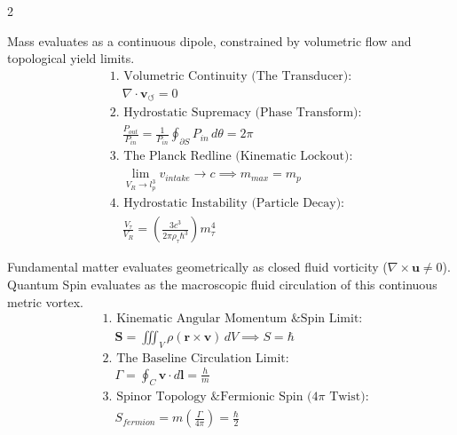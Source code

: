 \documentclass[11pt, a4paper]{article}
\newcounter{cheatnum}
\begin{document}
\begin{multicols}{2}
\begin{tcolorbox}[cheatbox, title={\refstepcounter{cheatnum}\label{box:bag_pressure}\thecheatnum. Confinement Pressure \& Work \scriptsize\hfill\hyperref[sec:deriv_bag_pressure]{[Proof $\downarrow$]}}]
\end{tcolorbox}



\begin{tcolorbox}[cheatbox, title={\refstepcounter{cheatnum}\label{box:unified_engine}\thecheatnum. The Unified Topological Engine \scriptsize\hfill\hyperref[sec:deriv_unified_engine]{[Proof $\downarrow$]}}]
Mass evaluates as a continuous dipole, constrained by volumetric flow and topological yield limits.
\begin{align}
&\text{1. Volumetric Continuity (The Transducer):} \nonumber \\
    &\quad \nabla \cdot \mathbf{v}_{\circlearrowleft} = 0 \label{eq:engine_transduction} \\
    &\text{2. Hydrostatic Supremacy (Phase Transform):} \nonumber \\
    &\quad \frac{P_{out}}{P_{in}} = \frac{1}{P_{in}} \oint_{\partial S} P_{in} \, d\theta = 2\pi \label{eq:engine_supremacy} \\
    &\text{3. The Planck Redline (Kinematic Lockout):} \nonumber \\
    &\quad \lim_{V_R \to l_p^3} v_{intake} \to c \implies m_{max} = m_p \label{eq:engine_redline} \\
    &\text{4. Hydrostatic Instability (Particle Decay):} \nonumber \\
    &\quad \frac{V_\tau}{V_R} = \left(\frac{3c^3}{2\pi\rho_{\tau}\hbar^3}\right) m_\tau^4 \label{eq:engine_decay}
\end{align}
\end{tcolorbox}

\begin{tcolorbox}[cheatbox, title={\refstepcounter{cheatnum}\label{box:quantum_spin}\thecheatnum. Fluid Circulation \& The Topological Origin of Spin \scriptsize\hfill\hyperref[sec:deriv_quantum_spin]{[Proof $\downarrow$]}}]
Fundamental matter evaluates geometrically as closed fluid vorticity ($\nabla \times \mathbf{u} \neq 0$). Quantum Spin evaluates as the macroscopic fluid circulation of this continuous metric vortex.
\begin{align}
    &\text{1. Kinematic Angular Momentum \& Spin Limit:} \nonumber \\
    &\quad \mathbf{S} = \iiint_V \rho (\mathbf{r} \times \mathbf{v}) \, dV \implies S = \hbar \label{eq:transverse_shear_spin} \\
    &\text{2. The Baseline Circulation Limit:} \nonumber \\
    &\quad \Gamma = \oint_C \mathbf{v} \cdot d\mathbf{l} = \frac{h}{m} \label{eq:fluid_circulation} \\
    &\text{3. Spinor Topology \& Fermionic Spin ($4\pi$ Twist):} \nonumber \\
    &\quad S_{fermion} = m \left( \frac{\Gamma}{4\pi} \right) = \frac{\hbar}{2} \label{eq:spinor_topology}
\end{align}
\end{tcolorbox}


\end{multicols}
\end{document}
